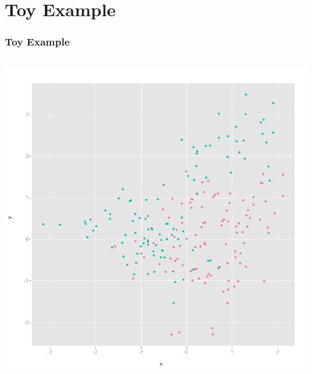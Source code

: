 \documentclass{beamer}
\begin{document}
\section{Toy Example}


\begin{frame}
\frametitle{Toy Example}
\begin{columns}[c] %
\includegraphics{toyex.png}
	\end{columns}
\end{frame}
 
\end{document}
